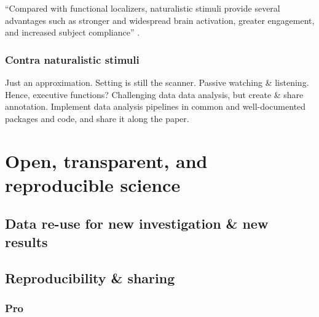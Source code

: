 

%
``Compared with functional localizers, naturalistic stimuli provide several
advantages such as stronger and widespread brain activation, greater engagement,
and increased subject compliance'' \citep{jiahui2020predicting}.

\subsubsection{Contra naturalistic stimuli}

%
Just an approximation.
%
Setting is still the scanner.
%
Passive watching \& listening. Hence, executive functions?
%
Challenging data data analysis, but create \& share annotation.
%
Implement data analysis pipelines in common and well-documented packages and
code, and share it along the paper.


\section{Open, transparent, and reproducible science}


\subsection{Data re-use for new investigation \& new results}






\subsection{Reproducibility \& sharing}



\subsubsection{Pro}

